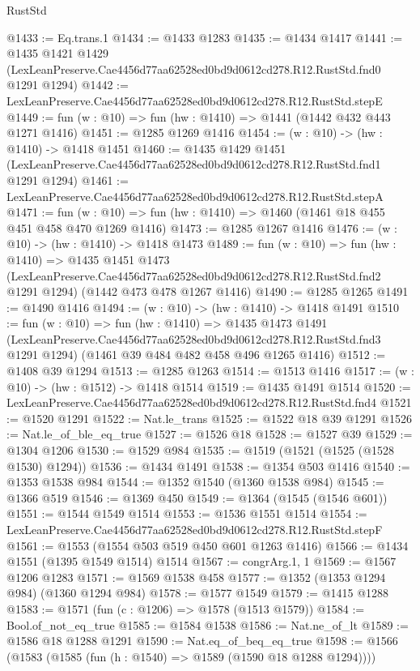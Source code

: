 \begin{lexlean}{RustStd}
\begin{coremodule}
@1433 := Eq.trans.{1}
@1434 := @1433 @1283
@1435 := @1434 @1417
@1441 := @1435
    @1421
    @1429
    (LexLeanPreserve.Cae4456d77aa62528ed0bd9d0612cd278.R12.RustStd.fnd0 @1291 @1294)
@1442 := LexLeanPreserve.Cae4456d77aa62528ed0bd9d0612cd278.R12.RustStd.stepE
@1449 := fun (w : @10) => fun (hw : @1410) => @1441 (@1442 @432 @443 @1271 @1416)
@1451 := @1285 @1269 @1416
@1454 := (w : @10) -> (hw : @1410) -> @1418 @1451
@1460 := @1435
    @1429
    @1451
    (LexLeanPreserve.Cae4456d77aa62528ed0bd9d0612cd278.R12.RustStd.fnd1 @1291 @1294)
@1461 := LexLeanPreserve.Cae4456d77aa62528ed0bd9d0612cd278.R12.RustStd.stepA
@1471 := fun (w : @10) => fun (hw : @1410) => @1460 (@1461 @18 @455 @451 @458 @470 @1269 @1416)
@1473 := @1285 @1267 @1416
@1476 := (w : @10) -> (hw : @1410) -> @1418 @1473
@1489 := fun (w : @10) =>
  fun (hw : @1410) =>
  @1435
    @1451
    @1473
    (LexLeanPreserve.Cae4456d77aa62528ed0bd9d0612cd278.R12.RustStd.fnd2 @1291 @1294)
    (@1442 @473 @478 @1267 @1416)
@1490 := @1285 @1265
@1491 := @1490 @1416
@1494 := (w : @10) -> (hw : @1410) -> @1418 @1491
@1510 := fun (w : @10) =>
  fun (hw : @1410) =>
  @1435
    @1473
    @1491
    (LexLeanPreserve.Cae4456d77aa62528ed0bd9d0612cd278.R12.RustStd.fnd3 @1291 @1294)
    (@1461 @39 @484 @482 @458 @496 @1265 @1416)
@1512 := @1408 @39 @1294
@1513 := @1285 @1263
@1514 := @1513 @1416
@1517 := (w : @10) -> (hw : @1512) -> @1418 @1514
@1519 := @1435 @1491 @1514
@1520 := LexLeanPreserve.Cae4456d77aa62528ed0bd9d0612cd278.R12.RustStd.fnd4
@1521 := @1520 @1291
@1522 := Nat.le_trans
@1525 := @1522 @18 @39 @1291
@1526 := Nat.le_of_ble_eq_true
@1527 := @1526 @18
@1528 := @1527 @39
@1529 := @1304 @1206
@1530 := @1529 @984
@1535 := @1519 (@1521 (@1525 (@1528 @1530) @1294))
@1536 := @1434 @1491
@1538 := @1354 @503 @1416
@1540 := @1353 @1538 @984
@1544 := @1352 @1540 (@1360 @1538 @984)
@1545 := @1366 @519
@1546 := @1369 @450
@1549 := @1364 (@1545 (@1546 @601))
@1551 := @1544 @1549 @1514
@1553 := @1536 @1551 @1514
@1554 := LexLeanPreserve.Cae4456d77aa62528ed0bd9d0612cd278.R12.RustStd.stepF
@1561 := @1553 (@1554 @503 @519 @450 @601 @1263 @1416)
@1566 := @1434 @1551 (@1395 @1549 @1514) @1514
@1567 := congrArg.{1, 1}
@1569 := @1567 @1206 @1283
@1571 := @1569 @1538 @458
@1577 := @1352 (@1353 @1294 @984) (@1360 @1294 @984)
@1578 := @1577 @1549
@1579 := @1415 @1288
@1583 := @1571 (fun (c : @1206) => @1578 (@1513 @1579))
@1584 := Bool.of_not_eq_true
@1585 := @1584 @1538
@1586 := Nat.ne_of_lt
@1589 := @1586 @18 @1288 @1291
@1590 := Nat.eq_of_beq_eq_true
@1598 := @1566 (@1583 (@1585 (fun (h : @1540) => @1589 (@1590 @18 @1288 @1294))))

\end{coremodule}
\end{lexlean}
